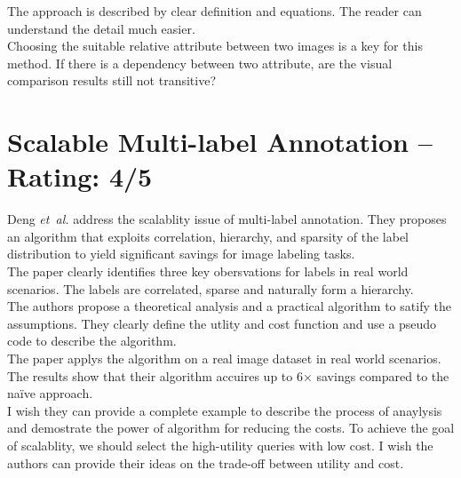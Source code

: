\documentclass[a4paper]{article}
\begin{document}
The approach is described by clear definition and equations. The reader can understand the detail much easier. \\

Choosing the suitable relative attribute between two images is a key for this method. If there is a dependency between two attribute, are the visual comparison results still not transitive?

\section{Scalable Multi-label Annotation -- Rating: 4/5}
Deng \emph{et~al.} \cite{Deng2014} address the scalablity issue of multi-label annotation. They proposes an algorithm that exploits correlation, hierarchy, and sparsity of the label distribution to yield significant savings for image labeling tasks.\\

The paper clearly identifies three key obersvations for labels in real world scenarios. The labels are correlated, sparse and naturally form a hierarchy.\\

The authors propose a theoretical analysis and a practical algorithm to satify the assumptions. They clearly define the utlity and cost function and use a pseudo code to describe the algorithm.\\

The paper applys the algorithm on a real image dataset in real world scenarios. The results show that their algorithm accuires up to 6× savings compared to the na\"{i}ve approach.\\

I wish they can provide a complete example to describe the process of anaylysis and demostrate the power of algorithm for reducing the costs. To achieve the goal of scalablity, we should select the high-utility queries with low cost. I wish the authors can provide their ideas on the trade-off between utility and cost.




\end{document}
